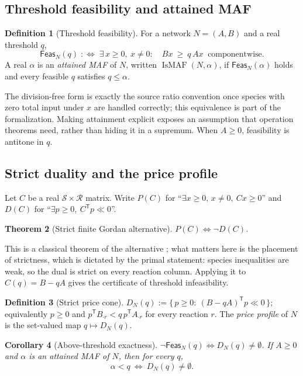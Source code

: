 \documentclass[11pt,a4paper]{article}
\theoremstyle{plain}
\newtheorem{theorem}{Theorem}[section]
\newtheorem{corollary}[theorem]{Corollary}
\theoremstyle{definition}
\newtheorem{definition}[theorem]{Definition}
\theoremstyle{remark}
\newcommand{\Feas}{\mathsf{Feas}}
\newcommand{\Tp}{^{\mathsf T}}
\begin{document}
\subsection{Threshold feasibility and attained MAF}

\begin{definition}[Threshold feasibility]\label{def:feas}
For a network $N=(A,B)$ and a real threshold $q$,
\[
\Feas_N(q)\;:\Longleftrightarrow\;\exists\,x\ge 0,\ x\neq 0:\quad Bx\ \ge\ q\,Ax\ \text{ componentwise.}
\]
A real $\alpha$ is an \emph{attained MAF} of $N$, written $\operatorname{IsMAF}(N,\alpha)$, if $\Feas_N(\alpha)$ holds and every feasible $q$ satisfies $q\le\alpha$.
\end{definition}

The division-free form is exactly the source ratio convention once species with zero total input under $x$ are handled correctly; this equivalence is part of the formalization. Making attainment explicit exposes an assumption that operation theorems need, rather than hiding it in a supremum. When $A\ge 0$, feasibility is antitone in $q$.

\subsection{Strict duality and the price profile}

Let $C$ be a real $\mathcal S\times\mathcal R$ matrix. Write $P(C)$ for ``$\exists x\ge 0,\,x\neq 0,\ Cx\ge 0$'' and $D(C)$ for ``$\exists p\ge 0,\ C\Tp p\ll 0$''.

\begin{theorem}[Strict finite Gordan alternative]\label{thm:gordan}
$P(C)\iff\neg D(C)$.
\end{theorem}

This is a classical theorem of the alternative \cite{gordan1873,schrijver1986}; what matters here is the placement of strictness, which is dictated by the primal statement: species inequalities are weak, so the dual is strict on every reaction column. Applying it to $C(q)=B-qA$ gives the certificate of threshold infeasibility.

\begin{definition}[Strict price cone]
$D_N(q):=\{\,p\ge 0:\ (B-qA)\Tp p\ll 0\,\}$; equivalently $p\ge 0$ and $p\Tp B_{\cdot r}<q\,p\Tp A_{\cdot r}$ for every reaction $r$. The \emph{price profile} of $N$ is the set-valued map $q\mapsto D_N(q)$.
\end{definition}

\begin{corollary}[Above-threshold exactness]\label{cor:profile}
$\neg\Feas_N(q)\iff D_N(q)\neq\emptyset$. If $A\ge 0$ and $\alpha$ is an attained MAF of $N$, then for every $q$,
\[
\alpha<q\ \iff\ D_N(q)\neq\emptyset .
\]
\end{corollary}
\end{document}
